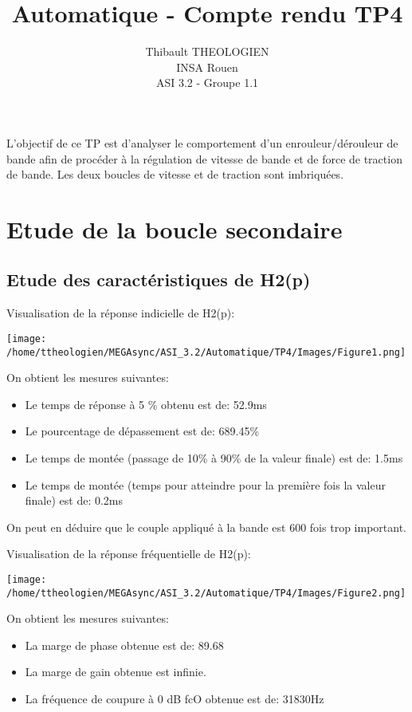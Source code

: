 \documentclass[a4paper,12pt]{article}
\title{Automatique - Compte rendu TP4}
\author{
	Thibault THEOLOGIEN\\
	INSA Rouen\\
	ASI 3.2 - Groupe 1.1
}
\begin{document}
	\maketitle
	\tableofcontents
	\newpage

	\par L'objectif de ce TP est d'analyser le comportement d'un enrouleur/dérouleur de bande afin de procéder à la régulation de vitesse de bande et de force de traction de bande.
	Les deux boucles de vitesse et de traction sont imbriquées.

	\section{Etude de la boucle secondaire}
		\subsection{Etude des caractéristiques de H2(p)}
			\par Visualisation de la réponse indicielle de H2(p):
			\begin{center}
				\texttt{[image: /home/ttheologien/MEGAsync/ASI\_3.2/Automatique/TP4/Images/Figure1.png]}
			\end{center}

			\par On obtient les mesures suivantes:
			\begin{itemize}
				\item Le temps de réponse à 5 \% obtenu est de: 52.9ms
				\item Le pourcentage de dépassement est de: 689.45\%
				\item Le temps de montée (passage de 10\% à 90\% de la valeur finale) est de: 1.5ms
				\item Le temps de montée (temps pour atteindre pour la première fois la valeur finale) est de: 0.2ms
			\end{itemize}
			On peut en déduire que le couple appliqué à la bande est 600 fois trop important.
			\pagebreak

			\par Visualisation de la réponse fréquentielle de H2(p):
			\begin{center}
				\texttt{[image: /home/ttheologien/MEGAsync/ASI\_3.2/Automatique/TP4/Images/Figure2.png]}
			\end{center}

			\par On obtient les mesures suivantes:
			\begin{itemize}
				\item La marge de phase obtenue est de: 89.68\degre
				\item La marge de gain obtenue est infinie.
				\item La fréquence de coupure à 0 dB fcO obtenue est de: 31830Hz
			\end{itemize}
			\pagebreak
\end{document}
